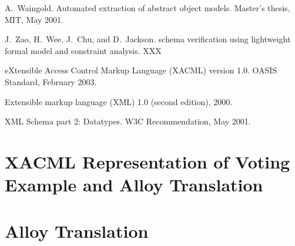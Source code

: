 \documentclass{acm_proc_article-sp}
\begin{document}
\begin{thebibliography}{10}
A.~Waingold.
\newblock Automated extraction of abstract object models.
\newblock Master's thesis, MIT, May 2001.

J.~Zao, H.~Wee, J.~Chu, and D.~Jackson.
 schema verification using lightweight formal model and constraint analysis.
\newblock XXX

{eXtensible Access Control Markup Language (XACML)} version 1.0.
\newblock OASIS Standard, February 2003.

Extensible markup language ({XML}) 1.0 (second edition), 2000.

{XML Schema} part 2: Datatypes.
\newblock W3C Recommendation, May 2001.

\end{thebibliography}

\clearpage
\appendix
\section{XACML Representation of Voting Example and Alloy Translation}
\label{sec:xacml-repr-voting}

{ \small

}
\newpage

\section{Alloy Translation}
\label{sec:alloy-trans}

{ \small

}
\end{document}
